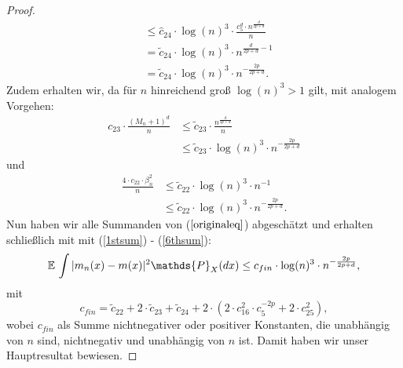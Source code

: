 \begin{proof}
\begin{equation}
\begin{split}
& \leq \hat{c}_{24} \cdot \log(n)^3 \cdot \frac{c_5^d\cdot n^{\frac{d}{2p + d}}}{n} \\
& = \tilde{c}_{24} \cdot \log(n)^3 \cdot n^{\frac{d}{2p + d} - 1} \\
& = \tilde{c}_{24} \cdot \log(n)^3 \cdot n^{-\frac{2p}{2p + d}}.
\end{split}
\end{equation}
Zudem erhalten wir, da für $n$ hinreichend groß $\log(n)^3 > 1$ gilt, mit analogem Vorgehen:
\begin{equation}
\label{5thsum}
\begin{split}
c_{23} \cdot \frac{(M_n + 1)^d}{n} & \leq \tilde{c}_{23} \cdot \frac{n^{\frac{d}{2p + d}}}{n} \\
& \leq \tilde{c}_{23} \cdot \log(n)^3 \cdot n^{- \frac{2p}{2p + d}} 
\end{split}
\end{equation} 
und 
\begin{equation}
\label{6thsum}
\begin{split}
\frac{4 \cdot c_{22} \cdot \beta_n^2}{n} & \leq \tilde{c}_{22} \cdot \log(n)^3 \cdot n^{-1} \\
& \leq \tilde{c}_{22} \cdot \log(n)^3 \cdot n^{- \frac{2p}{2p + d}}.  
\end{split}
\end{equation} 
Nun haben wir alle Summanden von ($\ref{originaleq}$) abgeschätzt und erhalten schließlich mit mit (\ref{1stsum}) - (\ref{6thsum}):
\begin{equation*}
\E \int |m_n(x) - m(x)|^2 \mathds{P}_X(dx) \leq c_{fin} \cdot \log(n)^3 \cdot n^{- \frac{2p}{2p + d}},
\end{equation*}
mit 
$$c_{fin} = \tilde{c}_{22} + 2 \cdot \tilde{c}_{23} + \tilde{c}_{24} + 2 \cdot (2 \cdot c_{16}^2 \cdot c_{5}^{-2p} + 2 \cdot  c_{25}^2),$$
wobei $c_{fin}$ als Summe nichtnegativer oder positiver Konstanten, die unabhängig von $n$ sind, nichtnegativ und unabhängig von $n$ ist.
Damit haben wir unser Hauptresultat bewiesen.
\end{proof}